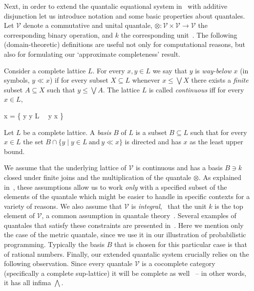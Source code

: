 \documentclass[a4paper,UKenglish,cleveref, autoref, thm-restate]{lipics-v2021}
\begin{document}
Next, in order to extend the quantalic equational system
in~\cite{dahlqvist22,dahlqvist2023syntactic} with additive disjunction let us
introduce notation and some basic properties about quantales.  Let
$\mathcal{V}$ denote a commutative and unital quantale, $\otimes : \mathcal{V}
\times \mathcal{V} \to \mathcal{V}$ the corresponding binary operation, and $k$
the corresponding unit~\cite{paseka00}.  The following (domain-theoretic)
definitions are useful not only for computational reasons, but also for
formulating our `approximate completeness' result.
\begin{definition}
	Consider a complete lattice $L$.  For every $x, y \in L$ we say that
	$y$ is \emph{way-below} $x$ (in symbols, $y \ll x$) if for every
	subset $X \subseteq L$ whenever $x \leq \bigvee X$ there exists a
	\emph{finite} subset $A \subseteq X$ such that $y \leq \bigvee A$.
	The lattice $L$ is called \emph{continuous} iff for every $x \in L$,
	\begin{flalign*}
		x = \bigvee \{ y  \mid y \in L\  \ y \ll x \}
	\end{flalign*}
\end{definition}

\begin{definition}
	Let $L$ be a complete lattice. A \emph{basis} $B$ of $L$ is a subset
	$B \subseteq L$ such that for every $x \in L$ the set
	$B \cap \{ y \mid y \in L\ \text{and} \ y \ll x \}$ is directed and
	has $x$ as the least upper bound.
\end{definition}
We assume that the underlying lattice of $\mathcal{V}$ is continuous and has a
basis $B \ni k$ closed under finite joins and the multiplication of the
quantale $\otimes$. As explained in~\cite{dahlqvist22,dahlqvist2023syntactic},
these assumptions allow us to work \emph{only} with a specified subset of the
elements of the quantale which might be easier to handle in specific contexts
for a variety of reasons.  We also assume that $\mathcal{V}$ is
\emph{integral}, \ie\ that the unit $k$ is the top element of $\mathcal{V}$, a
common assumption in quantale theory~\cite{velebil19}. Several examples of
quantales that satisfy these constraints are presented
in~\cite{dahlqvist22,dahlqvist2023syntactic}. Here we mention only the case of
the metric quantale, since we use it in our illustration of probabilistic
programming. Typically the basis $B$ that is chosen for this particular case is
that of rational numbers.  Finally, our extended quantalic system crucially
relies on the following observation.  Since every quantale $\mathcal{V}$ is a
cocomplete category (specifically a complete sup-lattice) it will be complete
as well~\cite[Section 12]{cats} -- in other words, it has all infima
$\bigwedge$. 
\end{document}
